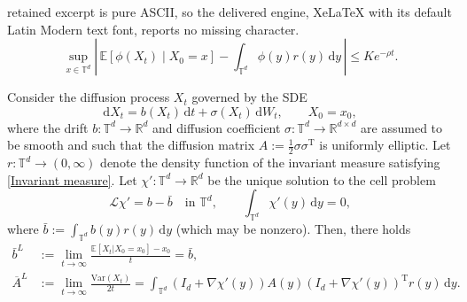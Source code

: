 \documentclass[10pt,a4paper]{amsart}
\begin{document}
retained excerpt is pure ASCII, so the delivered engine, XeLaTeX with its default Latin Modern text font, reports no missing character.
\begin{equation}\label{Invariant measure}
	\sup_{x \in \mathbb{T}^d} \left|\, \mathbb{E}[\phi(X_t) \mid X_0 = x] - \int_{\mathbb{T}^d} \phi(y) r(y)\, \mathrm{d}y \,\right| \leq K e^{-\rho t}.
\end{equation}

 \begin{theorem}\label{Relation between Lagrangian and Eulerian frameworks}
 Consider the diffusion process $X_t$ governed by the SDE 
    \begin{equation}\label{target SDE}
        \mathrm{d}X_t = b(X_t)\,\mathrm{d}t + \sigma(X_t)\,\mathrm{d}W_t,\qquad X_0 = x_0,
\end{equation}
where the drift $b:\mathbb{T}^d\rightarrow \mathbb{R}^d$ and diffusion coefficient $\sigma:\mathbb{T}^d\rightarrow \mathbb{R}^{d \times d}$ are assumed to be smooth and such that the diffusion matrix $A := \frac{1}{2}\sigma\sigma^{\mathrm{T}}$ is uniformly elliptic. Let $r:\mathbb{T}^d\rightarrow (0,\infty)$ denote the density function of the invariant measure satisfying \eqref{Invariant measure}. Let $\chi' :\mathbb{T}^d \rightarrow \mathbb{R}^d$ be the unique solution to the cell problem
    \begin{equation}\label{chip eqn}
        \mathcal{L}\chi' = b - \bar{b}\quad\text{in }\mathbb{T}^d, \qquad \int_{\mathbb{T}^d}\chi'(y)\,\mathrm{d}y = 0,
    \end{equation}
    where $\bar{b}:=\int_{\mathbb{T}^d}b(y)r(y)\,\mathrm{d}y$ (which may be nonzero). Then, there holds
     \begin{align*}
 		\bar{b}^L &:=\lim_{t\to \infty}\frac{\mathbb{E}[X_t|X_0 = x_0]- x_0}{t}  = \bar{b},\\ \overline{A}^L &:= \lim_{t\to \infty}\frac{\mathrm{Var}(X_t)}{2t}  =\int_{\mathbb{T}^d} \left(I_d + \nabla \chi'(y)\right)A(y)\left(I_d+\nabla \chi'(y)\right)^{\mathrm{T}}r(y)\,\mathrm{d}y.
 \end{align*} 
\end{theorem}
\end{document}
